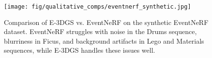\begin{figure}[ht]
\centering
\texttt{[image: fig/qualitative\_comps/eventnerf\_synthetic.jpg]}
\caption{
Comparison of E-3DGS vs. EventNeRF on the synthetic EventNeRF dataset. EventNeRF struggles with noise in the Drums sequence, blurriness in Ficus, and background artifacts in Lego and Materials sequences, while E-3DGS handles these issues well.}
\label{fig:synthetic_eventnerf}
\end{figure}

